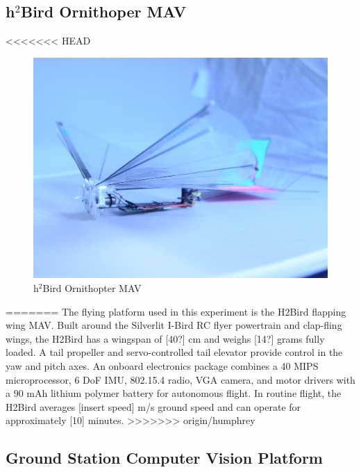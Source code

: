 \documentclass[letterpaper, 10 pt, conference]{ieeeconf}
\begin{document}
\subsection{h$^2$Bird Ornithoper MAV}
<<<<<<< HEAD
\begin{figure}[tb]
\centering
\includegraphics[width=\linewidth]{figures/h2bird.jpg}
\caption{h$^2$Bird Ornithopter MAV}
\label{fig:H2Bird}
\end{figure}

=======
The flying platform used in this experiment is the H2Bird flapping wing MAV. Built around the Silverlit I-Bird RC flyer powertrain and clap-fling wings, the H2Bird has a wingspan of [40?] cm and weighs [14?] grams fully loaded. A tail propeller and servo-controlled tail elevator provide control in the yaw and pitch axes. An onboard electronics package combines a 40 MIPS microprocessor, 6 DoF IMU, 802.15.4 radio, VGA camera, and motor drivers with a 90 mAh lithium polymer battery for autonomous flight. In routine flight, the H2Bird averages [insert speed] m/s ground speed and can operate for approximately [10] minutes.
>>>>>>> origin/humphrey

\subsection{Ground Station Computer Vision Platform}


\end{document}
